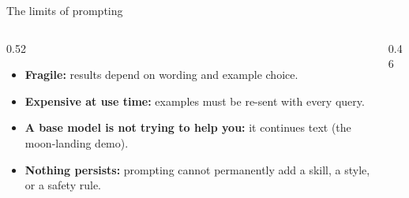 \begin{frame}{The limits of prompting}
\begin{columns}[T]
\begin{column}{0.52\textwidth}
\begin{itemize}\setlength{\itemsep}{6pt}
  \item \textbf{Fragile:} results depend on wording and example choice.
  \item \textbf{Expensive at use time:} examples must be re-sent with every query.
  \item \textbf{A base model is not trying to help you:} it continues text (the moon-landing demo).
  \item \textbf{Nothing persists:} prompting cannot permanently add a skill, a style, or a safety rule.
\end{itemize}
\end{column}
\begin{column}{0.46\textwidth}
\end{column}
\end{columns}
\end{frame}
